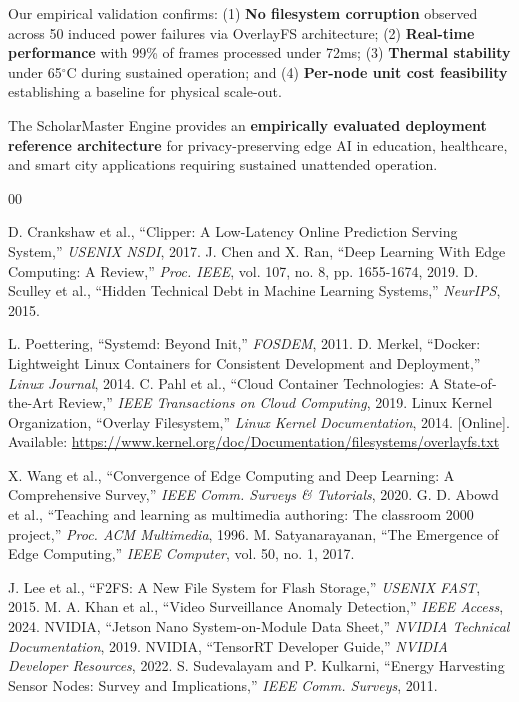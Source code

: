 \documentclass[conference]{IEEEtran}
\begin{document}
Our empirical validation confirms: (1) \textbf{No filesystem corruption} observed across 50 induced power failures via OverlayFS architecture; (2) \textbf{Real-time performance} with 99\% of frames processed under 72ms; (3) \textbf{Thermal stability} under 65$^{\circ}$C during sustained operation; and (4) \textbf{Per-node unit cost feasibility} establishing a baseline for physical scale-out.

The ScholarMaster Engine provides an \textbf{empirically evaluated deployment reference architecture} for privacy-preserving edge AI in education, healthcare, and smart city applications requiring sustained unattended operation.

\begin{thebibliography}{00}

 D. Crankshaw et al., ``Clipper: A Low-Latency Online Prediction Serving System,'' \textit{USENIX NSDI}, 2017.
 J. Chen and X. Ran, ``Deep Learning With Edge Computing: A Review,'' \textit{Proc. IEEE}, vol. 107, no. 8, pp. 1655-1674, 2019.
 D. Sculley et al., ``Hidden Technical Debt in Machine Learning Systems,'' \textit{NeurIPS}, 2015.

 L. Poettering, ``Systemd: Beyond Init,'' \textit{FOSDEM}, 2011.
 D. Merkel, ``Docker: Lightweight Linux Containers for Consistent Development and Deployment,'' \textit{Linux Journal}, 2014.
 C. Pahl et al., ``Cloud Container Technologies: A State-of-the-Art Review,'' \textit{IEEE Transactions on Cloud Computing}, 2019.
 Linux Kernel Organization, ``Overlay Filesystem,'' \textit{Linux Kernel Documentation}, 2014. [Online]. Available: \url{https://www.kernel.org/doc/Documentation/filesystems/overlayfs.txt}

 X. Wang et al., ``Convergence of Edge Computing and Deep Learning: A Comprehensive Survey,'' \textit{IEEE Comm. Surveys \& Tutorials}, 2020.
 G. D. Abowd et al., ``Teaching and learning as multimedia authoring: The classroom 2000 project,'' \textit{Proc. ACM Multimedia}, 1996.
 M. Satyanarayanan, ``The Emergence of Edge Computing,'' \textit{IEEE Computer}, vol. 50, no. 1, 2017.

 J. Lee et al., ``F2FS: A New File System for Flash Storage,'' \textit{USENIX FAST}, 2015.
 M. A. Khan et al., ``Video Surveillance Anomaly Detection,'' \textit{IEEE Access}, 2024.
 NVIDIA, ``Jetson Nano System-on-Module Data Sheet,'' \textit{NVIDIA Technical Documentation}, 2019.
 NVIDIA, ``TensorRT Developer Guide,'' \textit{NVIDIA Developer Resources}, 2022.
 S. Sudevalayam and P. Kulkarni, ``Energy Harvesting Sensor Nodes: Survey and Implications,'' \textit{IEEE Comm. Surveys}, 2011.


\end{thebibliography}
\end{document}
